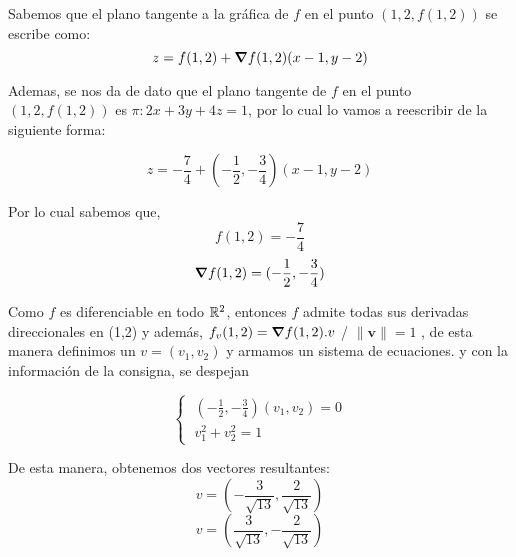 
\begin{solution}
Sabemos que el plano tangente a la gráfica de $f$ en el punto $(1,2,f(1,2))$ se escribe como:
\[   
    z= f(1,2) + \grad f(1,2)(x-1,y-2)
\]

Ademas, se nos da de dato que el plano tangente de $f$ en el punto $(1,2,f(1,2))$ es $\pi:2x+3y+4z=1$, por lo cual lo vamos a reescribir de la siguiente forma:

\[   
z= -\frac{7}{4} + (-\frac{1}{2},-\frac{3}{4})(x-1,y-2)
\]

Por lo cual sabemos que,
\[   
f(1,2)=-\frac{7}{4}
\]
\[
 \grad f(1,2)=(-\frac{1}{2},-\frac{3}{4})
\]


    Como   $f$ es diferenciable en todo $\mathbb{R}^2$, entonces $f$ admite todas sus derivadas direccionales en (1,2) y además, $f_v(1,2)=\grad f(1,2).v$ / $\|\mathbf{v}\|=1$ , de esta manera definimos un $v=(v_1,v_2)$ y armamos un sistema de ecuaciones.
     y con la información de la consigna, se despejan
     
    \[\begin{cases}
            \;(-\frac{1}{2},-\frac{3}{4})(v_1,v_2)=0 \\[5pt]
            \;v_1^2+v_2^2=1
        \end{cases}
    \]
    
    De esta manera, obtenemos dos vectores resultantes:
    \[
    v=(-\frac{3}{\sqrt{13}},\frac{2}{\sqrt{13}})
    \]
     \[
    v=(\frac{3}{\sqrt{13}},-\frac{2}{\sqrt{13}})
    \]
    

\newpage
\end{solution}

